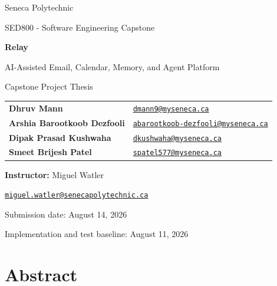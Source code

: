 \documentclass[
]{report}
\author{}
\date{}
\begin{document}
\begin{titlepage}
  \centering
  \vspace*{1.2cm}
  {\Large Seneca Polytechnic\par}
  \vspace{0.5cm}
  {\large SED800 - Software Engineering Capstone\par}
  \vfill
  {\Huge\bfseries Relay\par}
  \vspace{0.35cm}
  {\LARGE AI-Assisted Email, Calendar, Memory, and Agent Platform\par}
  \vspace{0.9cm}
  {\Large Capstone Project Thesis\par}
  \vfill
  {\small
  \begin{tabular}{ll}
    \textbf{Dhruv Mann} & \href{mailto:dmann9@myseneca.ca}{\nolinkurl{dmann9@myseneca.ca}} \\
    \textbf{Arshia Barootkoob Dezfooli} & \href{mailto:abarootkoob-dezfooli@myseneca.ca}{\nolinkurl{abarootkoob-dezfooli@myseneca.ca}} \\
    \textbf{Dipak Prasad Kushwaha} & \href{mailto:dkushwaha@myseneca.ca}{\nolinkurl{dkushwaha@myseneca.ca}} \\
    \textbf{Smeet Brijesh Patel} & \href{mailto:spatel577@myseneca.ca}{\nolinkurl{spatel577@myseneca.ca}} \\
  \end{tabular}}
  \vspace{0.65cm}

  {\large \textbf{Instructor:} Miguel Watler\par}
  {\small \href{mailto:miguel.watler@senecapolytechnic.ca}{\nolinkurl{miguel.watler@senecapolytechnic.ca}}\par}
  \vfill
  {\large Submission date: August 14, 2026\par}
  \vspace{0.25cm}
  {\large Implementation and test baseline: August 11, 2026\par}
\end{titlepage}

\hypersetup{linkcolor=blue}
\setcounter{tocdepth}{2}
\tableofcontents
\clearpage
{}

\chapter*{Abstract}\label{abstract}
\end{document}
